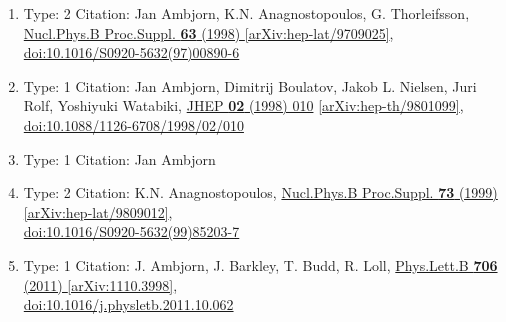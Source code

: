 \documentclass[a4paper,10pt]{article}
\begin{document}
\begin{enumerate}
\begin{enumerate}
  \item Type: 2 Citation: Jan Ambjorn, K.N. Anagnostopoulos, G. Thorleifsson, \href{https://www.doi.org/10.1016/S0920-5632(97)00890-6}{Nucl.Phys.B Proc.Suppl. {\bf 63} (1998) }  \href{https://arxiv.org/abs/hep-lat/9709025}{[arXiv:hep-lat/9709025]},\\\href{https://www.doi.org/10.1016/S0920-5632(97)00890-6}{doi:10.1016/S0920-5632(97)00890-6}
  \item Type: 1 Citation: Jan Ambjorn, Dimitrij Boulatov, Jakob L. Nielsen, Juri Rolf, Yoshiyuki Watabiki, \href{https://www.doi.org/10.1088/1126-6708/1998/02/010}{JHEP {\bf 02} (1998) 010}  \href{https://arxiv.org/abs/hep-th/9801099}{[arXiv:hep-th/9801099]},\\\href{https://www.doi.org/10.1088/1126-6708/1998/02/010}{doi:10.1088/1126-6708/1998/02/010}
  \item Type: 1 Citation: Jan Ambjorn
  \item Type: 2 Citation: K.N. Anagnostopoulos, \href{https://www.doi.org/10.1016/S0920-5632(99)85203-7}{Nucl.Phys.B Proc.Suppl. {\bf 73} (1999) }  \href{https://arxiv.org/abs/hep-lat/9809012}{[arXiv:hep-lat/9809012]},\\\href{https://www.doi.org/10.1016/S0920-5632(99)85203-7}{doi:10.1016/S0920-5632(99)85203-7}
  \item Type: 1 Citation: J. Ambjorn, J. Barkley, T. Budd, R. Loll, \href{https://www.doi.org/10.1016/j.physletb.2011.10.062}{Phys.Lett.B {\bf 706} (2011) }  \href{https://arxiv.org/abs/1110.3998}{[arXiv:1110.3998]},\\\href{https://www.doi.org/10.1016/j.physletb.2011.10.062}{doi:10.1016/j.physletb.2011.10.062}

\end{enumerate}
\end{enumerate}
\end{document}
